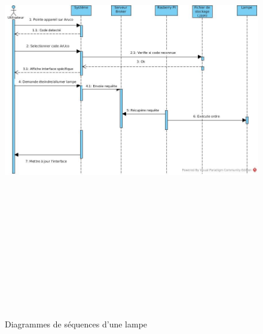 \documentclass[12pt,a4paper]{article}
\begin{document}
\begin{figure}[!ht]
  \centering
  \includegraphics[width = 15cm,height=20cm]{DDS_Lampe.jpg}
  \caption{Diagrammes de séquences d'une lampe}
\end{figure}
\newpage
\end{document}
